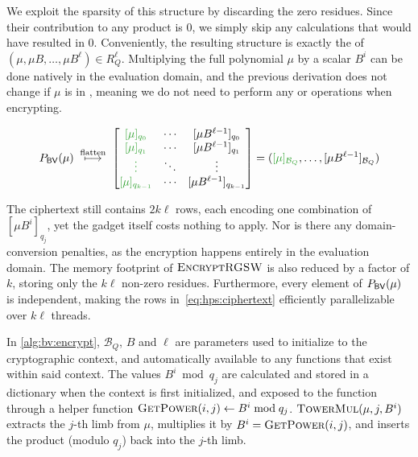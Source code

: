 We exploit the sparsity of this structure by discarding the zero residues. Since their contribution to any product is $0$, we simply skip any calculations that would have resulted in 0. Conveniently, the resulting structure is exactly the \firstForm{} of $(\mu, \mu B, \dots, \mu B^{\ell}) \in R_Q^{\ell}$. Multiplying the full polynomial $\mu$ by a scalar $B^i$ can be done natively in the evaluation domain, and the previous derivation does not change if $\mu$ is in \secondForm{}, meaning we do not need to perform any  or  operations when encrypting.

\begin{equation*} %
    {P}_{\mathsf{BV}}(\mu) \;\overset{\tiny\text{flatten}}{\longmapsto}\;
    \begin{bmatrix}
        \textcolor{hpsgreen}{[\mu]_{q_0}} & \cdots & [\mu B^{\ell - 1}]_{q_0} \\
        \textcolor{hpsgreen}{[\mu]_{q_1}} & \cdots & [\mu B^{\ell - 1}]_{q_1} \\
        \textcolor{hpsgreen}{\vdots} & \ddots & \vdots  \\
        \textcolor{hpsgreen}{[\mu]_{q_{k-1}}} & \cdots & [\mu B^{\ell - 1}]_{q_{k-1}}  \\
    \end{bmatrix}
    = (\textcolor{hpsgreen}{[\mu]_{\mathcal{B}_Q}}, \dots, [\mu B^{\ell - 1}]_{\mathcal{B}_Q})
\end{equation*}

The ciphertext still contains $2k\ell$ rows, each encoding one combination of $[\mu B^i]_{q_j}$, yet the gadget itself costs nothing to apply. Nor is there any domain-conversion penalties, as the encryption happens entirely in the evaluation domain. The memory footprint of $\Call{EncryptRGSW}{}$ is also reduced by a factor of $k$, storing only the $k\ell$ non-zero residues. Furthermore, every element of ${P}_{\mathsf{BV}}(\mu)$ is independent, making the rows in~\eqref{eq:hps:ciphertext} efficiently parallelizable over $k\ell$ threads.



In \autoref{alg:bv:encrypt}, $\mathcal{B}_Q$, $B$ and $\ell$ are parameters used to initialize to the cryptographic context, and automatically available to any functions that exist within said context. The values $B^i \bmod{q_j}$ are calculated and stored in a dictionary when the context is first initialized, and exposed to the function through a helper function $\Call{GetPower}{i, j} \gets B^i \bmod{q_j}$. $\Call{TowerMul}{\mu, j, B^i}$ extracts the $j$-th limb from $\mu$, multiplies it by $B^i = \Call{GetPower}{i, j}$, and inserts the product (modulo $q_j$) back into the $j$-th limb.